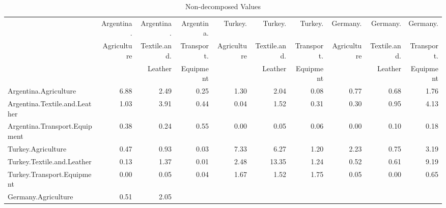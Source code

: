 \documentclass[a4paper]{article}\usepackage[]{graphicx}\usepackage[]{color}
\providecommand{\tabularnewline}{\\}
\begin{document}
\begin{sidewaystable}
{\scriptsize{}\caption{Non-decomposed Values}
\label{tab:noleon} }%
\begin{tabular}{lrrrrrrrrr}
\hline 
 &
{\scriptsize{}Argentina. } &
{\scriptsize{}Argentina. } &
{\scriptsize{}Argentina. } &
{\scriptsize{}Turkey. } &
{\scriptsize{}Turkey. } &
{\scriptsize{}Turkey. } &
{\scriptsize{}Germany. } &
{\scriptsize{}Germany. } &
{\scriptsize{}Germany.}\tabularnewline
 &
{\scriptsize{}Agriculture } &
{\scriptsize{}Textile.and. } &
{\scriptsize{}Transport. } &
{\scriptsize{}Agriculture } &
{\scriptsize{}Textile.and. } &
{\scriptsize{}Transport. } &
{\scriptsize{}Agriculture } &
{\scriptsize{}Textile.and. } &
{\scriptsize{}Transport.}\tabularnewline
 &
 &
{\scriptsize{}Leather } &
{\scriptsize{}Equipment } &
 &
{\scriptsize{}Leather } &
{\scriptsize{}Equipment } &
 &
{\scriptsize{}Leather } &
{\scriptsize{}Equipment}\tabularnewline
\hline 
{\scriptsize{}Argentina.Agriculture } &
{\scriptsize{}6.88 } &
{\scriptsize{}2.49 } &
{\scriptsize{}0.25 } &
{\scriptsize{}1.30 } &
{\scriptsize{}2.04 } &
{\scriptsize{}0.08 } &
{\scriptsize{}0.77 } &
{\scriptsize{}0.68 } &
{\scriptsize{}1.76 }\tabularnewline
{\scriptsize{}Argentina.Textile.and.Leather } &
{\scriptsize{}1.03 } &
{\scriptsize{}3.91 } &
{\scriptsize{}0.44 } &
{\scriptsize{}0.04 } &
{\scriptsize{}1.52 } &
{\scriptsize{}0.31 } &
{\scriptsize{}0.30 } &
{\scriptsize{}0.95 } &
{\scriptsize{}4.13 }\tabularnewline
{\scriptsize{}Argentina.Transport.Equipment } &
{\scriptsize{}0.38 } &
{\scriptsize{}0.24 } &
{\scriptsize{}0.55 } &
{\scriptsize{}0.00 } &
{\scriptsize{}0.05 } &
{\scriptsize{}0.06 } &
{\scriptsize{}0.00 } &
{\scriptsize{}0.10 } &
{\scriptsize{}0.18 }\tabularnewline
{\scriptsize{}Turkey.Agriculture } &
{\scriptsize{}0.47 } &
{\scriptsize{}0.93 } &
{\scriptsize{}0.03 } &
{\scriptsize{}7.33 } &
{\scriptsize{}6.27 } &
{\scriptsize{}1.20 } &
{\scriptsize{}2.23 } &
{\scriptsize{}0.75 } &
{\scriptsize{}3.19 }\tabularnewline
{\scriptsize{}Turkey.Textile.and.Leather } &
{\scriptsize{}0.13 } &
{\scriptsize{}1.37 } &
{\scriptsize{}0.01 } &
{\scriptsize{}2.48 } &
{\scriptsize{}13.35 } &
{\scriptsize{}1.24 } &
{\scriptsize{}0.52 } &
{\scriptsize{}0.61 } &
{\scriptsize{}9.19 }\tabularnewline
{\scriptsize{}Turkey.Transport.Equipment } &
{\scriptsize{}0.00 } &
{\scriptsize{}0.05 } &
{\scriptsize{}0.04 } &
{\scriptsize{}1.67 } &
{\scriptsize{}1.52 } &
{\scriptsize{}1.75 } &
{\scriptsize{}0.05 } &
{\scriptsize{}0.00 } &
{\scriptsize{}0.65 }\tabularnewline
{\scriptsize{}Germany.Agriculture } &
{\scriptsize{}0.51 } &
{\scriptsize{}2.05 } &

\end{tabular}
\end{sidewaystable}
\end{document}
